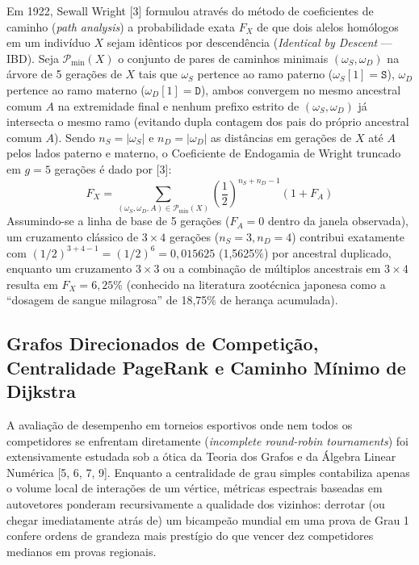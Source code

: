 \documentclass[conference]{IEEEtran}
\begin{document}
Em 1922, Sewall Wright [3] formulou através do método de coeficientes de caminho (\textit{path analysis}) a probabilidade exata $F_X$ de que dois alelos homólogos em um indivíduo $X$ sejam idênticos por descendência (\textit{Identical by Descent} --- IBD). Seja $\mathcal{P}_{\min}(X)$ o conjunto de pares de caminhos minimais $(\omega_S, \omega_D)$ na árvore de 5 gerações de $X$ tais que $\omega_S$ pertence ao ramo paterno ($\omega_S[1] = \texttt{S}$), $\omega_D$ pertence ao ramo materno ($\omega_D[1] = \texttt{D}$), ambos convergem no mesmo ancestral comum $A$ na extremidade final e nenhum prefixo estrito de $(\omega_S, \omega_D)$ já intersecta o mesmo ramo (evitando dupla contagem dos pais do próprio ancestral comum $A$). Sendo $n_S = |\omega_S|$ e $n_D = |\omega_D|$ as distâncias em gerações de $X$ até $A$ pelos lados paterno e materno, o Coeficiente de Endogamia de Wright truncado em $g = 5$ gerações é dado por [3]:
\begin{equation}
    F_X = \sum_{(\omega_S, \omega_D, A) \in \mathcal{P}_{\min}(X)} \left(\frac{1}{2}\right)^{n_S + n_D - 1} (1 + F_A)
\end{equation}
Assumindo-se a linha de base de 5 gerações ($F_A = 0$ dentro da janela observada), um cruzamento clássico de $3 \times 4$ gerações ($n_S = 3, n_D = 4$) contribui exatamente com $(1/2)^{3+4-1} = (1/2)^6 = 0,015625$ (1,5625\%)
por ancestral duplicado, enquanto um cruzamento $3 \times 3$ ou a combinação de múltiplos ancestrais em $3 \times 4$ resulta em $F_X = 6,25$\%
(conhecido na literatura zootécnica japonesa como a ``dosagem de sangue milagrosa'' de 18,75\%
de herança acumulada).

\subsection{Grafos Direcionados de Competição, Centralidade PageRank e Caminho Mínimo de Dijkstra}
A avaliação de desempenho em torneios esportivos onde nem todos os competidores se enfrentam diretamente (\textit{incomplete round-robin tournaments}) foi extensivamente estudada sob a ótica da Teoria dos Grafos e da Álgebra Linear Numérica [5, 6, 7, 9]. Enquanto a centralidade de grau simples contabiliza apenas o volume local de interações de um vértice, métricas espectrais baseadas em autovetores ponderam recursivamente a qualidade dos vizinhos: derrotar (ou chegar imediatamente atrás de) um bicampeão mundial em uma prova de Grau 1 confere ordens de grandeza mais prestígio do que vencer dez competidores medianos em provas regionais.
\end{document}
